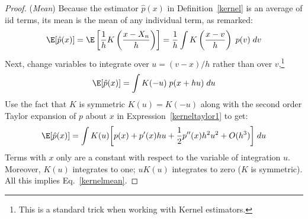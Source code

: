 \documentclass[12pt]{article}
\theoremstyle{plain}
\theoremstyle{definition}
\theoremstyle{remark}
\begin{document}
\clearpage
\begin{proof}
(\emph{Mean})
Because the estimator $\hat{p}(x)$ in Definition~\ref{kernel} is an
average of iid terms, its mean is the mean of any individual term, as
remarked:
\begin{align}
  \E[\hat{p}(x)]
  =
  \E\left[
  \frac{1}{h}
  K\left(
  \frac{x-X_n}{h}
  \right)
  \right]
  =
  \frac{1}{h}
  \int
  K\left(
  \frac{x-v}{h}
  \right)
  \;
  p(v)
  \;dv
  \label{kernelmeanstart}
\end{align}
Next, change variables to integrate over $u=(v-x)/h$ rather
than over $v$,\footnote{%
  This is a standard trick when working with Kernel estimators.
}
\begin{align*}
  \E[\hat{p}(x)]
  =
  \int
  K(-u)
  \;
  p(x+hu)
  \;du
\end{align*}
Use the fact that $K$ is symmetric $K(u)=K(-u)$ along with the second
order Taylor expansion of $p$ about $x$ in
Expression~\ref{kerneltaylor1} to get:
\begin{align*}
  \E[\hat{p}(x)]
  =
  \int
  K(u)
  \bigg[
  p(x)
  + p'(x) hu
  + \frac{1}{2}p''(x)h^2u^2
  + O(h^3)
  \bigg]
  \;du
\end{align*}
Terms with $x$ only are a constant with respect to the variable of
integration $u$. Moreover, $K(u)$ integrates to one; $uK(u)$ integrates
to zero ($K$ is symmetric).
All this implies Eq.~\ref{kernelmean}.


\end{proof}
\end{document}

